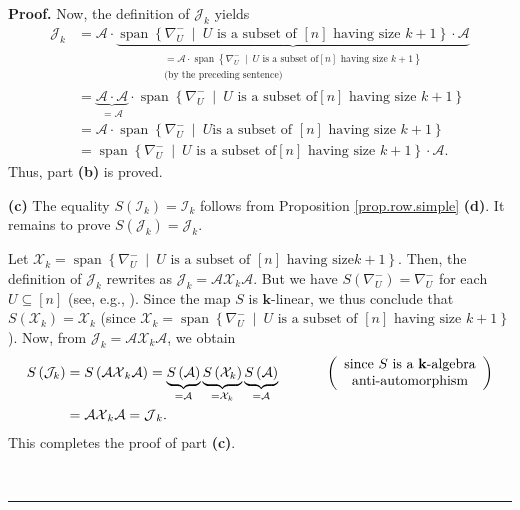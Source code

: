 \documentclass[numbers=enddot,12pt,final,onecolumn,notitlepage]{scrartcl}%
\numberwithin{exer}{subsection}
\theoremstyle{definition}
\newenvironment{proof}[1][Proof]{\noindent\textbf{#1.} }{\ \rule{0.5em}{0.5em}}
\begin{document}
\begin{proof}
Now, the definition of $\mathcal{J}_{k}$ yields%
\begin{align*}
\mathcal{J}_{k}  &  =\mathcal{A}\cdot\underbrace{\operatorname*{span}\left\{
\nabla_{U}^{-}\ \mid\ U\text{ is a subset of }\left[  n\right]  \text{ having
size }k+1\right\}  \cdot\mathcal{A}}_{\substack{=\mathcal{A}\cdot
\operatorname*{span}\left\{  \nabla_{U}^{-}\ \mid\ U\text{ is a subset of
}\left[  n\right]  \text{ having size }k+1\right\}  \\\text{(by the preceding
sentence)}}}\\
&  =\underbrace{\mathcal{A}\cdot\mathcal{A}}_{=\mathcal{A}}\cdot
\operatorname*{span}\left\{  \nabla_{U}^{-}\ \mid\ U\text{ is a subset of
}\left[  n\right]  \text{ having size }k+1\right\} \\
&  =\mathcal{A}\cdot\operatorname*{span}\left\{  \nabla_{U}^{-}\ \mid\ U\text{
is a subset of }\left[  n\right]  \text{ having size }k+1\right\} \\
&  =\operatorname*{span}\left\{  \nabla_{U}^{-}\ \mid\ U\text{ is a subset of
}\left[  n\right]  \text{ having size }k+1\right\}  \cdot\mathcal{A}.
\end{align*}
Thus, part \textbf{(b)} is proved. \medskip

\textbf{(c)} The equality $S\left(  \mathcal{I}_{k}\right)  =\mathcal{I}_{k}$
follows from Proposition \ref{prop.row.simple} \textbf{(d)}. It remains to
prove $S\left(  \mathcal{J}_{k}\right)  =\mathcal{J}_{k}$.

Let $\mathcal{X}_{k}=\operatorname*{span}\left\{  \nabla_{U}^{-}%
\ \mid\ U\text{ is a subset of }\left[  n\right]  \text{ having size
}k+1\right\}  $. Then, the definition of $\mathcal{J}_{k}$ rewrites as
$\mathcal{J}_{k}=\mathcal{AX}_{k}\mathcal{A}$. But we have $S\left(
\nabla_{U}^{-}\right)  =\nabla_{U}^{-}$ for each $U\subseteq\left[  n\right]
$ (see, e.g., \cite[Example 3.11.13 \textbf{(c)}]{sga}). Since the map $S$ is
$\mathbf{k}$-linear, we thus conclude that $S\left(  \mathcal{X}_{k}\right)
=\mathcal{X}_{k}$ (since $\mathcal{X}_{k}=\operatorname*{span}\left\{
\nabla_{U}^{-}\ \mid\ U\text{ is a subset of }\left[  n\right]  \text{ having
size }k+1\right\}  $). Now, from $\mathcal{J}_{k}=\mathcal{AX}_{k}\mathcal{A}%
$, we obtain%
\begin{align*}
S\left(  \mathcal{J}_{k}\right)   &  =S\left(  \mathcal{AX}_{k}\mathcal{A}%
\right)  =\underbrace{S\left(  \mathcal{A}\right)  }_{=\mathcal{A}%
}\underbrace{S\left(  \mathcal{X}_{k}\right)  }_{=\mathcal{X}_{k}%
}\underbrace{S\left(  \mathcal{A}\right)  }_{=\mathcal{A}}%
\ \ \ \ \ \ \ \ \ \ \left(
\begin{array}
[c]{c}%
\text{since }S\text{ is a }\mathbf{k}\text{-algebra}\\
\text{anti-automorphism}%
\end{array}
\right) \\
&  =\mathcal{AX}_{k}\mathcal{A=J}_{k}.
\end{align*}
This completes the proof of part \textbf{(c)}. \medskip


\end{proof}
\end{document}
